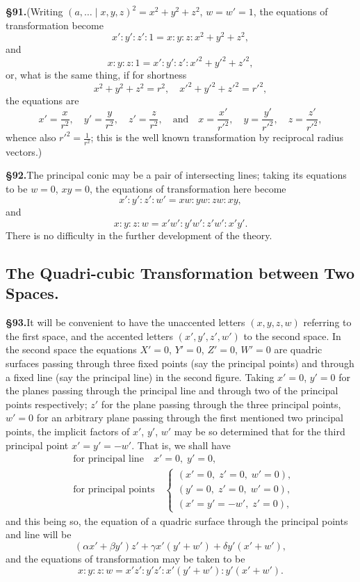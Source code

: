 \documentclass[11pt,a4paper]{article}
\begin{document}
\textbf{\S 91.}\quad (Writing $(a, \ldots \mid x, y, z)^2 = x^2 + y^2 + z^2$, $w = w' = 1$, the equations of transformation become
\[
x' : y' : z' : 1 = x : y : z : x^2 + y^2 + z^2,
\]
and
\[
x : y : z : 1 = x' : y' : z' : x'^2 + y'^2 + z'^2,
\]
or, what is the same thing, if for shortness
\[
x^2 + y^2 + z^2 = r^2, \quad x'^2 + y'^2 + z'^2 = r'^2,
\]
the equations are
\[
x' = \frac{x}{r^2},\quad y' = \frac{y}{r^2},\quad z' = \frac{z}{r^2},
\quad\text{and}\quad
x = \frac{x'}{r'^2},\quad y = \frac{y'}{r'^2},\quad z = \frac{z'}{r'^2},
\]
whence also $r'^2 = \frac{1}{r^2}$; this is the well known transformation by reciprocal radius vectors.)

\textbf{\S 92.}\quad The principal conic may be a pair of intersecting lines; taking its equations to be $w = 0$, $xy = 0$, the equations of transformation here become
\[
x' : y' : z' : w' = xw : yw : zw : xy,
\]
and
\[
x : y : z : w = x'w' : y'w' : z'w' : x'y'.
\]
There is no difficulty in the further development of the theory.

\subsection*{The Quadri-cubic Transformation between Two Spaces.}

\textbf{\S 93.}\quad It will be convenient to have the unaccented letters $(x, y, z, w)$ referring to the first space, and the accented letters $(x', y', z', w')$ to the second space. In the second space the equations $X' = 0$, $Y' = 0$, $Z' = 0$, $W' = 0$ are quadric surfaces passing through three fixed points (say the principal points) and through a fixed line (say the principal line) in the second figure. Taking $x' = 0$, $y' = 0$ for the planes passing through the principal line and through two of the principal points respectively; $z'$ for the plane passing through the three principal points, $w' = 0$ for an arbitrary plane passing through the first mentioned two principal points, the implicit factors of $x'$, $y'$, $w'$ may be so determined that for the third principal point $x' = y' = -w'$. That is, we shall have
\begin{align*}
&\text{for principal line}\quad x' = 0,\; y' = 0,\\
&\text{for principal points}\quad
\begin{cases}
(x' = 0,\; z' = 0,\; w' = 0),\\
(y' = 0,\; z' = 0,\; w' = 0),\\
(x' = y' = -w',\; z' = 0),
\end{cases}
\end{align*}
and this being so, the equation of a quadric surface through the principal points and line will be
\[
(\alpha x' + \beta y')z' + \gamma x'(y' + w') + \delta y'(x' + w'),
\]
and the equations of transformation may be taken to be
\[
x : y : z : w = x'z' : y'z' : x'(y' + w') : y'(x' + w').
\]
\end{document}

